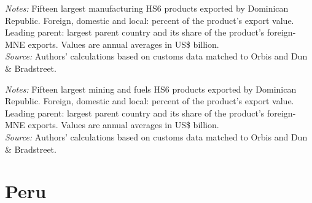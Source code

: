 \documentclass[11pt,a4paper]{article}
\begin{document}
\begin{table}[H]\centering\footnotesize%
  \caption{Dominican Republic, Manufacturing: Fifteen Largest Export Products}%
  \label{tab:c_hs6_DOM_manufacturing}%
  \par\vspace{3pt}%
  \begin{minipage}{0.95\textwidth}\footnotesize %
  \textit{Notes:} Fifteen largest manufacturing HS6 products exported by Dominican Republic. Foreign, domestic and local: percent of the product's export value. Leading parent: largest parent country and its share of the product's foreign-MNE exports. Values are annual averages in US\$ billion.\\[3pt]%
  \textit{Source:} Authors' calculations based on customs data matched to Orbis and Dun \& Bradstreet.%
  \end{minipage}%
  \end{table}
\begin{table}[H]\centering\footnotesize%
  \caption{Dominican Republic, Mining and Fuels: Fifteen Largest Export Products}%
  \label{tab:c_hs6_DOM_mining}%
  \par\vspace{3pt}%
  \begin{minipage}{0.95\textwidth}\footnotesize %
  \textit{Notes:} Fifteen largest mining and fuels HS6 products exported by Dominican Republic. Foreign, domestic and local: percent of the product's export value. Leading parent: largest parent country and its share of the product's foreign-MNE exports. Values are annual averages in US\$ billion.\\[3pt]%
  \textit{Source:} Authors' calculations based on customs data matched to Orbis and Dun \& Bradstreet.%
  \end{minipage}%
  \end{table}

\section{Peru}\label{sec:c_PER}
\end{document}
